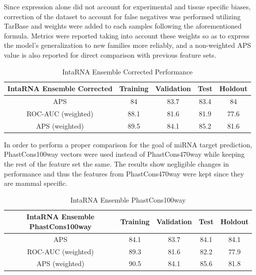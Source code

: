\documentclass[en,ack]{dimscthesis}
\begin{document}
Since expression alone did not account for experimental and tissue specific biases, correction of the dataset to account for false negatives was performed utilizing TarBase and weights were added to each samples following the aforementioned formula. Metrics were reported taking into account these weights so as to express the model's generalization to new families more reliably, and a non-weighted APS value is also reported for direct comparison with previous feature sets.

\begin{table}[H]
    \caption{IntaRNA Ensemble Corrected Performance}
    \label{tbl:IntaRNA Ensemble Corrected Performance}
    \begin{center} %
        \begin{tabular}{c|c|c|c|c}
            \textbf{IntaRNA Ensemble Corrected} & \textbf{Training} & \textbf{Validation}& \textbf{Test}& \textbf{Holdout} \\
            \hline
			APS & 84 & 83.7 & 83.4 & 84 \\
			ROC-AUC (weighted) & 88.1 & 81.6 & 81.9 & 77.6 \\
			APS (weighted) & 89.5 & 84.1 & 85.2 & 81.6 \\
            \hline
        \end{tabular}
    \end{center}
\end{table}

In order to perform a proper comparison for the goal of miRNA target prediction, PhastCons100way vectors were used instead of PhastCons470way while keeping the rest of the feature set the same. The results show negligible changes in performance and thus the features from PhastCons470way were kept since they are mammal specific.

\begin{table}[H]
    \caption{IntaRNA Ensemble PhastCons100way}
    \label{tbl:IntaRNA Ensemble PhastCons100way}
    \begin{center} %
        \begin{tabular}{c|c|c|c|c}
            \textbf{IntaRNA Ensemble PhastCons100way} & \textbf{Training} & \textbf{Validation}& \textbf{Test}& \textbf{Holdout} \\
            \hline
			APS & 84.1 & 83.7 & 84.1 & 84.1 \\
			ROC-AUC (weighted) & 89.3 & 81.6 & 82.2 & 77.9 \\
			APS (weighted) & 90.5 & 84.1 & 85.6 & 81.8 \\
            \hline
        \end{tabular}
    \end{center}
\end{table}
\end{document}

